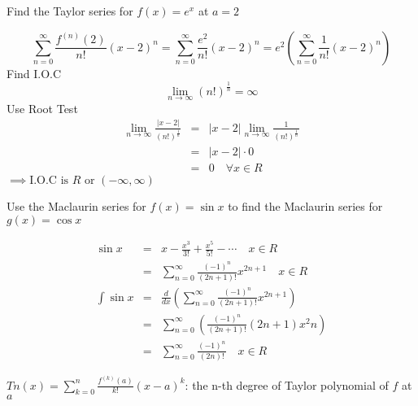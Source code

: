 \begin{eg}
Find the Taylor series for \(f(x) = e^x\) at \(a = 2\)

\soln
\[\displaystyle \sum^{\infty}_{n = 0} \frac{f^{(n)}(2)}{n!}(x - 2)^{n} = \sum^{\infty}_{n = 0} \frac{e^2}{n!}(x - 2)^n = e^2 (\sum^{\infty}_{n = 0} \frac{1}{n!} (x - 2)^n)\]
Find I.O.C
\[\displaystyle \lim_{n \to \infty} (n!)^{\frac{1}{n}} = \infty\]
Use Root Test
\[\begin{array}{rcl}
\displaystyle \lim_{n \to \infty} \frac{|x - 2|}{(n!)^{\frac{1}{n}}} & = & \displaystyle |x - 2| \lim_{n \to \infty} \frac{1}{(n!)^{\frac{1}{n}}}\\
& = & \displaystyle |x - 2| \cdot 0\\
& = & 0 \quad \forall x \in R
\end{array}\]
\(\implies \text{I.O.C is } R \text{ or } (-\infty, \infty)\)
\end{eg}
\begin{eg}
Use the Maclaurin series for \(f(x) = \sin x\) to find the Maclaurin series for \(g(x) = \cos x\)

\soln
\[\begin{array}{rcl}
\sin x & = & \displaystyle x - \frac{x^3}{3!} + \frac{x^5}{5!} - \cdots \quad x \in R\\
& = & \displaystyle \sum^{\infty}_{n = 0} \frac{(-1)^n}{(2n + 1)!} x^{2n + 1} \quad x \in R\\
\displaystyle \int \sin x & = & \displaystyle \frac{d}{dx} (\sum^{\infty}_{n = 0} \frac{(-1)^n}{(2n + 1)!} x^{2n + 1})\\
& = & \displaystyle \sum^{\infty}_{n = 0} (\frac{(-1)^n}{(2n + 1)!} (2n + 1)x^2n)\\
& = & \displaystyle \sum^{\infty}_{n = 0} \frac{(-1)^n}{(2n)!} \quad x \in R
\end{array}\]
\end{eg}
\begin{defn}
\(\displaystyle Tn(x) = \sum^n_{k = 0} \frac{f^{(k)}(a)}{k!} (x - a)^k\): the n-th degree of Taylor polynomial of \(f\) at \(a\) 
\end{defn}
